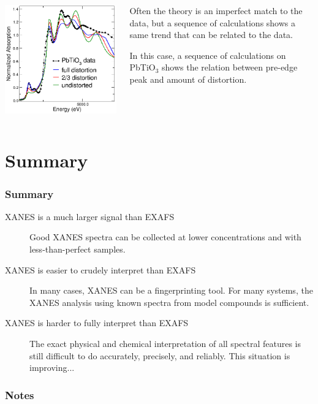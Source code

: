 \documentclass[10pt, xcolor=x11names, compress]{beamer}
\begin{document}
\begin{frame}
  \begin{columns}
    \begin{column}{0.4\linewidth}
      \begin{center}
        \includegraphics[width=0.9\linewidth]{images/pto.png}
      \end{center}
    \end{column}
    \begin{column}{0.6\linewidth}
      Often the theory is an imperfect match to the data, but a
      sequence of calculations shows a same trend that can be related
      to the data.

      In this case, a sequence of calculations on PbTiO$_3$ shows the
      relation between pre-edge peak and amount of distortion.
    \end{column}
  \end{columns}
\end{frame}

\section{Summary}

\begin{frame}
  \frametitle{Summary}
  \begin{description}
  \item[XANES is a much larger signal than EXAFS] Good XANES spectra
    can be collected at lower concentrations and with
    less-than-perfect samples.
  \item[XANES is easier to crudely interpret than EXAFS] In many
    cases, XANES can be a fingerprinting tool.  For many systems, the
    XANES analysis using known spectra from model compounds is
    sufficient.
  \item[XANES is harder to fully interpret than EXAFS] The exact
    physical and chemical interpretation of all spectral features is
    still difficult to do accurately, precisely, and reliably.  This
    situation is improving...
  \end{description}
\end{frame}

\begin{frame}
  \frametitle{Notes}
\end{frame}
\end{document}
